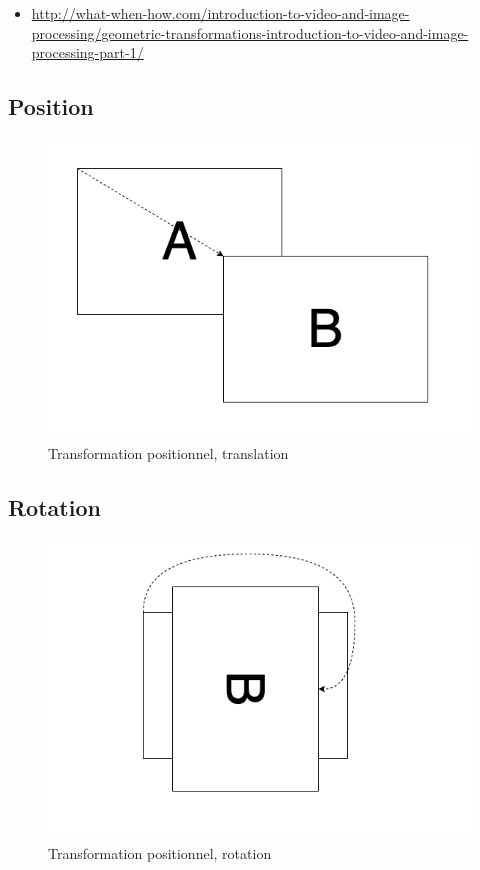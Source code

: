 \documentclass[
  french,
]{book}
\providecommand{\tightlist}{%
  \setlength{\itemsep}{0pt}\setlength{\parskip}{0pt}}
\begin{document}
\begin{itemize}
\tightlist
\item
  \url{http://what-when-how.com/introduction-to-video-and-image-processing/geometric-transformations-introduction-to-video-and-image-processing-part-1/}
\end{itemize}

\hypertarget{position}{%
\subsection{Position}\label{position}}

\begin{figure}
\centering
\includegraphics{medias/traiter/figures/dia_transfogeo_position.png}
\caption{Transformation positionnel, translation}
\end{figure}

\hypertarget{rotation}{%
\subsection{Rotation}\label{rotation}}

\begin{figure}
\centering
\includegraphics{medias/traiter/figures/dia_transfogeo_rotation.png}
\caption{Transformation positionnel, rotation}
\end{figure}
\end{document}
